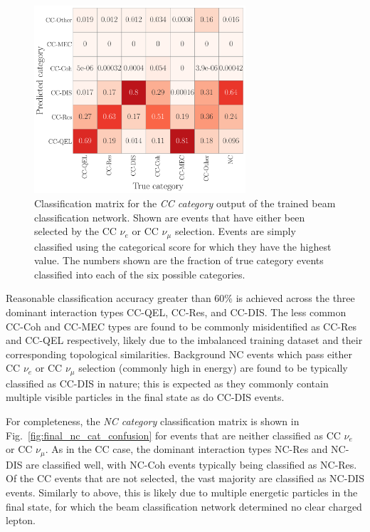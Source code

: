 \begin{figure} %
    \includegraphics[width=0.7\textwidth]{diagrams/6-cvn/chipsnet/final_cc_cat_confusion.pdf}
    \caption[Classification matrix for the CC category output of the beam classification network.]
    {Classification matrix for the \emph{CC category} output of the trained beam classification
        network. Shown are events that have either been selected by the CC $\nu_{e}$ or CC
        $\nu_{\mu}$ selection. Events are simply classified using the categorical score for which
        they have the highest value. The numbers shown are the fraction of true category events
        classified into each of the six possible categories.}
    \label{fig:final_cc_cat_confusion}
\end{figure}

Reasonable classification accuracy greater than 60\% is achieved across the three dominant
interaction types CC-QEL, CC-Res, and CC-DIS. The less common CC-Coh and CC-MEC types are found to
be commonly misidentified as CC-Res and CC-QEL respectively, likely due to the imbalanced training
dataset and their corresponding topological similarities. Background NC events which pass either
CC $\nu_{e}$ or CC $\nu_{\mu}$ selection (commonly high in energy) are found to be typically
classified as CC-DIS in nature; this is expected as they commonly contain multiple visible
particles in the final state as do CC-DIS events.

For completeness, the \emph{NC category} classification matrix is shown in
Fig.~\ref{fig:final_nc_cat_confusion} for events that are neither classified as CC $\nu_{e}$ or CC
$\nu_{\mu}$. As in the CC case, the dominant interaction types NC-Res and NC-DIS are classified
well, with NC-Coh events typically being classified as NC-Res. Of the CC events that are not
selected, the vast majority are classified as NC-DIS events. Similarly to above, this is likely
due to multiple energetic particles in the final state, for which the beam classification network
determined no clear charged lepton.

